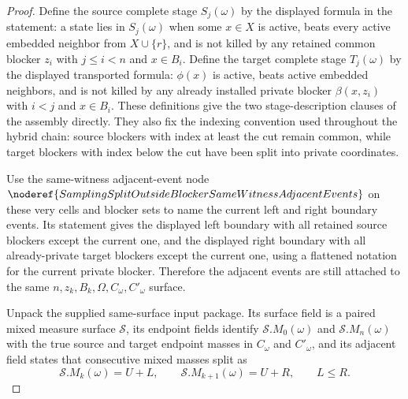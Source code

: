 \begin{proof}
Define the source complete stage \(S_j(\omega)\) by the displayed formula in
the statement: a state lies in \(S_j(\omega)\) when some \(x\in X\) is active,
beats every active embedded neighbor from \(X\cup\{r\}\), and is not killed by
any retained common blocker \(z_i\) with \(j\le i<n\) and \(x\in B_i\).
Define the target complete stage \(T_j(\omega)\) by the displayed transported
formula: \(\phi(x)\) is active, beats active embedded neighbors, and is not
killed by any already installed private blocker \(\beta(x,z_i)\) with
\(i<j\) and \(x\in B_i\).  These definitions give the two stage-description
clauses of the assembly directly.  They also fix the indexing convention
used throughout the hybrid chain: source blockers with index at least the cut
remain common, while target blockers with index below the cut have been
split into private coordinates.

Use the same-witness adjacent-event node
\(\noderef{SamplingSplitOutsideBlockerSameWitnessAdjacentEvents}\) on these
very cells and blocker sets to name the current left and right boundary
events.  Its statement gives the displayed left boundary with all retained
source blockers except the current one, and the displayed right boundary
with all already-private target blockers except the current one, using a
flattened notation for the current private blocker.  Therefore the adjacent
events are still attached to the same \(n,z_k,B_k,\Omega,C_\omega,C'_\omega\)
surface.

Unpack the supplied same-surface input package.  Its surface field is a
paired mixed measure surface \(\mathcal S\), its endpoint fields identify
\(\mathcal S.M_0(\omega)\) and \(\mathcal S.M_n(\omega)\) with the true
source and target endpoint masses in \(C_\omega\) and \(C'_\omega\), and its
adjacent field states that consecutive mixed masses split as
\[
  \mathcal S.M_k(\omega)=U+L,\qquad
  \mathcal S.M_{k+1}(\omega)=U+R,\qquad L\le R .
\]


\end{proof}

